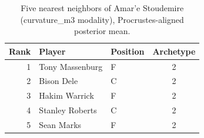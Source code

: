 \begin{table}[htbp]
  \centering\small
  \begin{tabular}{rllc}
    \toprule
    Rank & Player & Position & Archetype \\
    \midrule
    1 & Tony Massenburg & F & 2 \\
    2 & Bison Dele & C & 2 \\
    3 & Hakim Warrick & F & 2 \\
    4 & Stanley Roberts & C & 2 \\
    5 & Sean Marks & F & 2 \\
    \bottomrule
  \end{tabular}
  \caption{Five nearest neighbors of Amar'e Stoudemire (curvature_m3 modality), Procrustes-aligned posterior mean.}
  \label{tab:Amar_e_Stoudemire_neighbors_curvature_m3}
\end{table}

